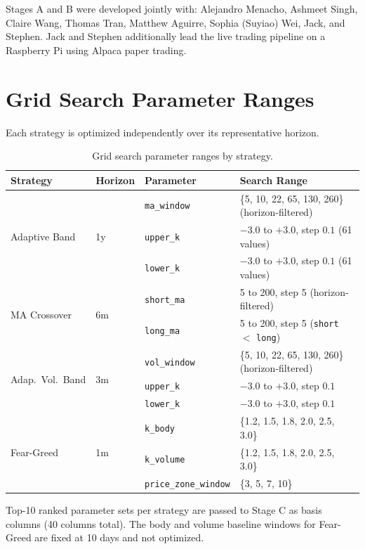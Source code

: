 \documentclass[11pt, letterpaper]{article}
\begin{document}
Stages A and B were developed jointly with: Alejandro Menacho, Ashmeet Singh,
Claire Wang, Thomas Tran, Matthew Aguirre, Sophia (Suyiao) Wei, Jack, and Stephen.
Jack and Stephen additionally lead the live trading pipeline on a Raspberry Pi
using Alpaca paper trading.

\appendix
\section{Grid Search Parameter Ranges}
\label{app:gridsearch}

Each strategy is optimized independently over its representative horizon.

\begin{table}[h]
\centering
\caption{Grid search parameter ranges by strategy.}
\label{tab:gridsearch}
\begin{tabular}{llll}
\toprule
Strategy & Horizon & Parameter & Search Range \\
\midrule
\multirow{3}{*}{Adaptive Band}
  & \multirow{3}{*}{1y}
  & \texttt{ma\_window}  & \{5, 10, 22, 65, 130, 260\} (horizon-filtered) \\
  && \texttt{upper\_k}   & $-3.0$ to $+3.0$, step $0.1$ (61 values) \\
  && \texttt{lower\_k}   & $-3.0$ to $+3.0$, step $0.1$ (61 values) \\
\midrule
\multirow{2}{*}{MA Crossover}
  & \multirow{2}{*}{6m}
  & \texttt{short\_ma}  & 5 to 200, step 5 (horizon-filtered) \\
  && \texttt{long\_ma}   & 5 to 200, step 5 (\texttt{short} $<$ \texttt{long}) \\
\midrule
\multirow{3}{*}{Adap.\ Vol.\ Band}
  & \multirow{3}{*}{3m}
  & \texttt{vol\_window} & \{5, 10, 22, 65, 130, 260\} (horizon-filtered) \\
  && \texttt{upper\_k}   & $-3.0$ to $+3.0$, step $0.1$ \\
  && \texttt{lower\_k}   & $-3.0$ to $+3.0$, step $0.1$ \\
\midrule
\multirow{3}{*}{Fear-Greed}
  & \multirow{3}{*}{1m}
  & \texttt{k\_body}               & \{1.2, 1.5, 1.8, 2.0, 2.5, 3.0\} \\
  && \texttt{k\_volume}             & \{1.2, 1.5, 1.8, 2.0, 2.5, 3.0\} \\
  && \texttt{price\_zone\_window}   & \{3, 5, 7, 10\} \\
\bottomrule
\end{tabular}
\end{table}

Top-10 ranked parameter sets per strategy are passed to Stage C as basis columns
(40 columns total). The body and volume baseline windows for Fear-Greed are fixed
at 10 days and not optimized.
\end{document}

